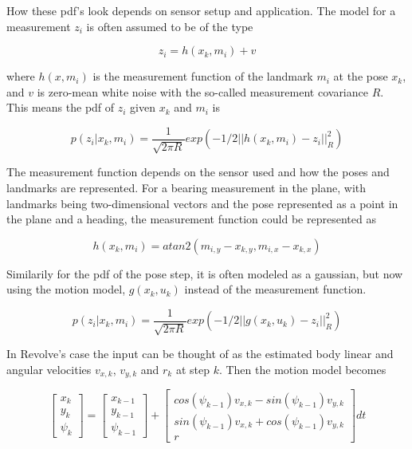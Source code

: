 How these pdf's look depends on sensor setup and application. The model for a measurement $z_i$ is often assumed to be of the type

\begin{equation}
    z_i = h(x_k,m_i) + v
\end{equation}

where $h(x,m_i)$ is the measurement function of the landmark $m_i$ at the pose $x_k$, and $v$ is zero-mean white noise with the so-called measurement covariance $R$. This means the pdf of $z_i$ given $x_k$ and $m_i$ is 

\begin{equation}
    p(z_i|x_k,m_i) = \frac{1}{\sqrt{2\pi R}}exp(-1/2||h(x_k,m_i) - z_i||^2_R)
\end{equation}

The measurement function depends on the sensor used and how the poses and landmarks are represented. For a bearing measurement in the plane, with landmarks being two-dimensional vectors and the pose represented as a point in the plane and a heading, the measurement function could be represented as

\begin{equation}
    h(x_k,m_i) = atan2(m_{i,y} - x_{k,y},m_{i,x} - x_{k,x})
\end{equation}

Similarily for the pdf of the pose step, it is often modeled as a gaussian, but now using the motion model, $g(x_k,u_k)$ instead of the measurement function. 

\begin{equation}
    p(z_i|x_k,m_i) = \frac{1}{\sqrt{2\pi R}}exp(-1/2||g(x_k,u_k) - z_i||^2_R)
\end{equation}

In Revolve's case the input can be thought of as the estimated body linear and angular velocities $v_{x,k}$, $v_{y,k}$ and $r_k$ at step $k$. Then the motion model becomes 

\begin{equation}
    \begin{bmatrix} x_k \\ y_k \\ \psi_k \end{bmatrix} = \begin{bmatrix} x_{k-1} \\ y_{k-1} \\ \psi_{k-1} \end{bmatrix} + \begin{bmatrix} cos(\psi_{k-1})v_{x,k} - sin(\psi_{k-1})v_{y,k} \\
    sin(\psi_{k-1})v_{x,k} + cos(\psi_{k-1})v_{y,k} \\ r
    \end{bmatrix} dt
\end{equation}

